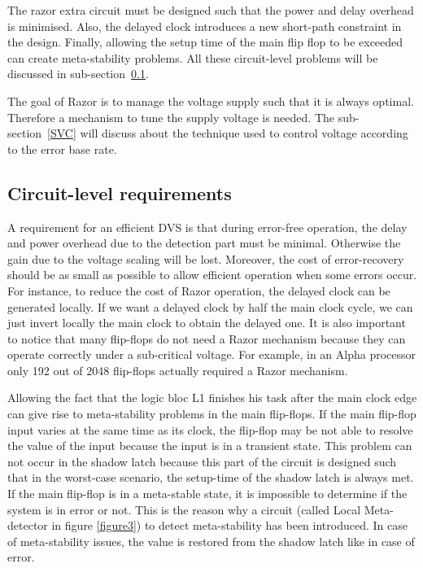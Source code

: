\documentclass[fleqn,envcountsame,runningheads,10pt,a4paper]{llncs}
\begin{document}
The razor extra circuit must be designed such that the power and delay overhead is minimised. Also, the delayed clock introduces a new short-path constraint in the design. Finally, allowing the setup time of the main flip flop to be exceeded can create meta-stability problems. All these circuit-level problems will be discussed in sub-section~\ref{CLR}.

The goal of Razor is to manage the voltage supply such that it is always optimal. Therefore a mechanism to tune the supply voltage is needed. The sub-section~\ref{SVC} will discuss about the technique used to control voltage according to the error base rate.

\subsection{Circuit-level requirements}
\label{CLR}
A requirement for an efficient DVS is that during error-free operation, the delay and power overhead due to the detection part must be minimal. Otherwise the gain due to the voltage scaling will be lost. Moreover, the cost of error-recovery should be as small as possible to allow efficient operation when some errors occur. For instance, to reduce the cost of Razor operation, the delayed clock can be generated locally. If we want a delayed clock by half the main clock cycle, we can just invert locally the main clock to obtain the delayed one. It is also important to notice that many flip-flops do not need a Razor mechanism  because they can operate correctly under a sub-critical voltage. For example, in an Alpha processor only 192 out of 2048 flip-flops actually required a Razor mechanism.

Allowing the fact that the logic bloc L1 finishes his task after the main clock edge can give rise to meta-stability problems in the main flip-flops. If the main flip-flop input varies at the same time as its clock, the flip-flop may be not able to resolve the value of the input because the input is in a transient state. This problem can not occur in the shadow latch because this part of the circuit is designed such that in the worst-case scenario, the setup-time of the shadow latch is always met. If the main flip-flop is in a meta-stable state, it is impossible to determine if the system is in error or not. This is the reason why a circuit (called Local Meta-detector in figure \ref{figure3}) to detect meta-stability has been introduced. In case of meta-stability issues, the value is restored from the shadow latch like in case of error.
\end{document}

